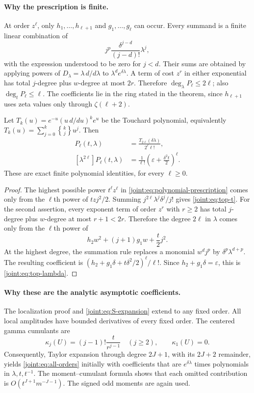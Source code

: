 \paragraph{Why the prescription is finite.}
At order $z^\ell$, only $h_1,\ldots,h_{\ell+1}$ and
$g_1,\ldots,g_\ell$ can occur. Every summand is a finite linear
combination of
\[
 j^p\frac{\delta^{j-d}}{(j-d)!}\lambda^j,
\]
with the expression understood to be zero for $j<d$.
Their sums are obtained by applying powers of
$D_\lambda=\lambda\,d/d\lambda$ to
$\lambda^d e^{\delta\lambda}$.
A term of cost $z^r$ in either exponential has total $j$-degree plus
$w$-degree at most $2r$. Therefore
$\deg_\lambda P_\ell\leq2\ell$; also
$\deg_tP_\ell\leq\ell$. The coefficients lie in the ring stated in
the theorem, since $h_{\ell+1}$ uses zeta values only through
$\zeta(\ell+2)$.

\begin{corollary}
\label{joint:cor:top-coefficients}
Let $T_k(u)=e^{-u}(u\,d/du)^ke^u$ be the Touchard polynomial,
equivalently $T_k(u)=\sum_{j=0}^k\genfrac{\{}{\}}{0pt}{}{k}{j}u^j$. Then
\begin{align}
 [t^\ell]P_\ell(t,\lambda)
   &=\frac{T_{2\ell}(\delta\lambda)}{2^\ell\ell!},\label{joint:eq:top-t}\\
 [\lambda^{2\ell}]P_\ell(t,\lambda)
   &=\frac1{\ell!}
           \left(\varepsilon+\frac{\delta^2t}{2}\right)^\ell.
 \label{joint:eq:top-lambda}
\end{align}
These are exact finite polynomial identities, for every $\ell\geq0$.
\end{corollary}
\begin{proof}
The highest possible power $t^\ell z^\ell$ in
\eqref{joint:eq:polynomial-prescription} comes only from the $\ell$th
power of $tzj^2/2$. Summing $j^{2\ell}\lambda^j\delta^j/j!$
gives \eqref{joint:eq:top-t}.
For the second assertion, every exponent term of order $z^r$ with
$r\geq2$ has total $j$-degree plus $w$-degree at most $r+1<2r$.
Therefore the degree $2\ell$ in $\lambda$ comes only from the
$\ell$th power of
\[
 h_2w^2+(j+1)g_1w+\frac t2j^2.
\]
At the highest degree, the summation rule replaces a monomial
$w^dj^p$ by $\delta^p\lambda^{d+p}$.
The resulting coefficient is
$(h_2+g_1\delta+t\delta^2/2)^\ell/\ell!$.
Since $h_2+g_1\delta=\varepsilon$, this is
\eqref{joint:eq:top-lambda}.
\end{proof}

\paragraph{Why these are the analytic asymptotic coefficients.}
The localization proof and \eqref{joint:eq:S-expansion} extend to any
fixed order. All local amplitudes have bounded derivatives of every
fixed order. The centered gamma cumulants are
\[
 \kappa_j(U)=(j-1)!\frac{t}{r^{j-1}}\quad(j\geq2),\qquad\kappa_1(U)=0.
\]
Consequently, Taylor expansion through degree $2J+1$, with its
$2J+2$ remainder, yields \eqref{joint:eq:all-orders} initially with
coefficients that are $e^{\delta\lambda}$ times polynomials in
$\lambda,t,t^{-1}$. The moment--cumulant formula shows that each
omitted contribution is $O(t^{J+1}m^{-J-1})$. The signed odd moments
are again used.

